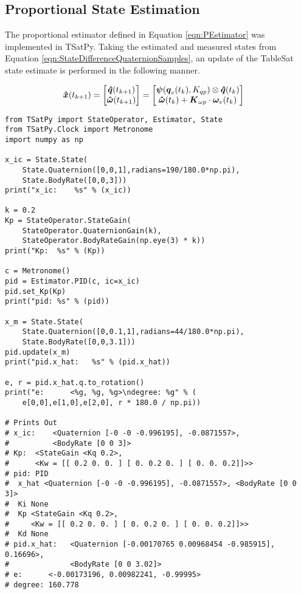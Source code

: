 \subsection{Proportional State Estimation}
\label{subsec:ProportionalEstimator}

The proportional estimator defined in Equation \ref{eqn:PEstimator} was implemented in TSatPy.  Taking the estimated and measured states from Equation \ref{eqn:StateDifferenceQuaternionSamples}, an update of the TableSat state estimate is performed in the following manner.

\begin{subequations}
  \begin{align}
    \boldsymbol{\hat{x}}(t_{k+1}) &= \begin{bmatrix} \boldsymbol{\hat{q}}(t_{k+1}) \\ \boldsymbol{\hat{\omega}}(t_{k+1}) \end{bmatrix} = \begin{bmatrix} \boldsymbol{\psi}(\boldsymbol{q}_e(t_{k}), K_{qp}) \otimes \boldsymbol{\hat{q}}(t_{k}) \\  \boldsymbol{\hat{\omega}}(t_{k}) + \boldsymbol{K}_{\omega p} \cdot \boldsymbol{\omega}_e(t_{k}) \end{bmatrix}
  \end{align}
  \label{eqn:PEstimator}
\end{subequations}

\begin{singlespace}
  \begin{verbatim}
from TSatPy import StateOperator, Estimator, State
from TSatPy.Clock import Metronome
import numpy as np

x_ic = State.State(
    State.Quaternion([0,0,1],radians=190/180.0*np.pi),
    State.BodyRate([0,0,3]))
print("x_ic:    %s" % (x_ic))

k = 0.2
Kp = StateOperator.StateGain(
    StateOperator.QuaternionGain(k),
    StateOperator.BodyRateGain(np.eye(3) * k))
print("Kp:  %s" % (Kp))

c = Metronome()
pid = Estimator.PID(c, ic=x_ic)
pid.set_Kp(Kp)
print("pid: %s" % (pid))

x_m = State.State(
    State.Quaternion([0,0.1,1],radians=44/180.0*np.pi),
    State.BodyRate([0,0,3.1]))
pid.update(x_m)
print("pid.x_hat:   %s" % (pid.x_hat))

e, r = pid.x_hat.q.to_rotation()
print("e:      <%g, %g, %g>\ndegree: %g" % (
    e[0,0],e[1,0],e[2,0], r * 180.0 / np.pi))

# Prints Out
# x_ic:    <Quaternion [-0 -0 -0.996195], -0.0871557>,
#          <BodyRate [0 0 3]>
# Kp:  <StateGain <Kq 0.2>,
#      <Kw = [[ 0.2 0. 0. ] [ 0. 0.2 0. ] [ 0. 0. 0.2]]>>
# pid: PID
#  x_hat <Quaternion [-0 -0 -0.996195], -0.0871557>, <BodyRate [0 0 3]>
#  Ki None
#  Kp <StateGain <Kq 0.2>,
#     <Kw = [[ 0.2 0. 0. ] [ 0. 0.2 0. ] [ 0. 0. 0.2]]>>
#  Kd None
# pid.x_hat:   <Quaternion [-0.00170765 0.00968454 -0.985915], 0.16696>,
#              <BodyRate [0 0 3.02]>
# e:      <-0.00173196, 0.00982241, -0.99995>
# degree: 160.778
  \end{verbatim}
\nocite{minted}
\end{singlespace}

